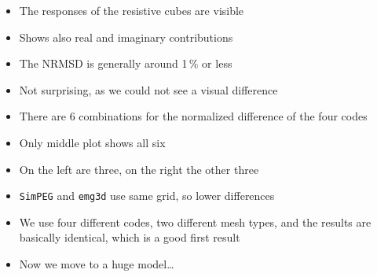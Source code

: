 \documentclass[xcolor=svgnames, aspectratio=169]{beamer}
\newcommand{\emg}[2]{\texttt{emg#1#2}\xspace}
\newcommand{\simpeg}{\texttt{SimPEG}\xspace}
\begin{document}
\begin{frame}[t]
{\begin{itemize}
      \item The responses of the resistive cubes are visible
      \item Shows also real and imaginary contributions
      \item The NRMSD is generally around 1\,\% or less
      \item Not surprising, as we could not see a visual difference
      \item There are 6 combinations for the normalized difference
        of the four codes
      \item Only middle plot shows all six
      \item On the left are three, on the right the other three
      \item \simpeg and \emg3d use same grid, so lower differences
      \item We use four different codes, two different mesh types, and the
        results are basically identical, which is a good first result
      \item Now we move to a huge model\ldots
    \end{itemize}
  }
\end{frame}
\end{document}
